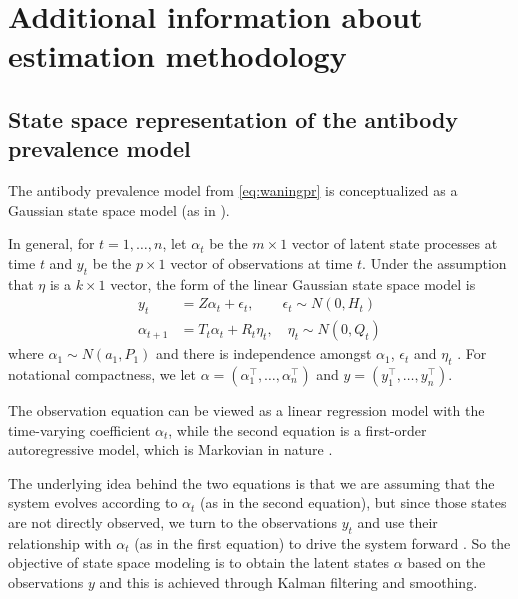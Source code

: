 \documentclass{article}
\begin{document}
\section{Additional information about estimation methodology}

\subsection{State space representation of the antibody prevalence model}\label{supp:ssapm} 

The antibody prevalence model from \autoref{eq:waningpr} is conceptualized
as a Gaussian state space model (as in \citealp{durbin2012time, helske2017kfas}).

In general, for $t = 1, \dots, n$, let $\alpha_t$ be the $m \times 1$ vector of latent
state processes at time $t$ and $y_t$ be the $p \times 1$ vector of observations
at time $t$. Under the assumption that $\eta$ is a $k \times 1$ vector, the
form of the linear Gaussian state space model is 
\begin{align}
y_t &= Z\alpha_t + \epsilon_t, \qquad \epsilon_t \sim N(0, H_t) \label{eq:ss1}\\
\alpha_{t+1} &= T_t\alpha_t + R_t\eta_t, \quad \eta_t \sim N(0, Q_t) \label{eq:ss2}
\end{align}
where $\alpha_1 \sim N(a_1, P_1)$ and 
there is independence amongst $\alpha_1$, $\epsilon_t$ and $\eta_t$
\citep{helske2017kfas, durbin2012time}. For notational
compactness, we let $\alpha = \left ( \alpha_1^\top, \dots, \alpha_n^\top \right )$
and $y = \left ( y_1^\top, \dots, y_n^\top \right )$.

The observation equation can be viewed as a linear regression model with the
time-varying coefficient $\alpha_t$, while the second equation is a first-order
autoregressive model, which is Markovian in nature \citep{durbin2012time}. 

The underlying idea behind the two equations is that we are assuming that the
system evolves according to $\alpha_t$ (as in the second equation), 
but since those states are
not directly observed, we turn to the observations $y_t$ and use their
relationship with $\alpha_t$ (as in the first equation) to drive the system
forward \citep{durbin2012time}. So the objective of state space modeling is to
obtain the latent states $\alpha$ based on the observations $y$ and this is
achieved through Kalman filtering and smoothing. 
\end{document}
